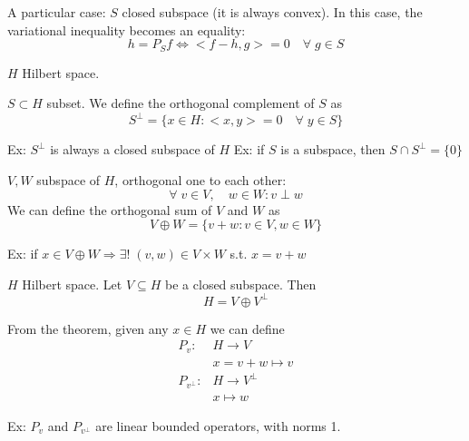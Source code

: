 \begin{remark}
    A particular case: \(S\) closed subspace (it is always convex). In this case, the variational inequality becomes an equality:
    \[
        h = P_S f \iff <f-h, g> = 0 \quad  \forall \; g \in S
    \]
\end{remark}

\(H\) Hilbert space. 
\begin{definition}
    \(S \subset H\) subset. We define the orthogonal complement of \(S\) as 
    \[
        S^\perp = \{ x \in H: <x, y> = 0 \quad \forall\; y \in S\}
    \]
\end{definition}
Ex: \(S^\perp \) is always a closed subspace of \(H\)
Ex: if \(S\) is a subspace, then \(S \cap S^\perp = \{0\}\)

\begin{definition}
    \(V, W\) subspace of \(H\), orthogonal one to each other:
    \[
        \forall \; v \in V, \quad w \in W: v \perp w
    \]
    We can define the orthogonal sum of \(V\) and \(W\) as 
    \[
        V \oplus W = \{ v+w : v \in V, w \in W \}
    \]
\end{definition}
Ex: if \(x \in V \oplus W \Rightarrow \exists! \; (v, w) \in V \times W\) s.t. \(x=v+w\)

\begin{theorem}
    \(H\) Hilbert space. Let \(V \subseteq H\) be a closed subspace. Then 
    \[
        H = V \oplus V^\perp
    \]
\end{theorem}

\begin{definition}
    From the theorem, given any \(x \in H\) we can define
    \[
        \begin{array}{rl}
            P_v: & H \to V \\
            & x = v + w \mapsto v \\ \tag*{orthogonal projections}
            P_{v^\perp} : & H \to V^\perp \\
            & x \mapsto w
        \end{array}
    \]
\end{definition}
Ex: \(P_v \) and \(P_{v^\perp}\) are linear bounded operators, with norms 1.